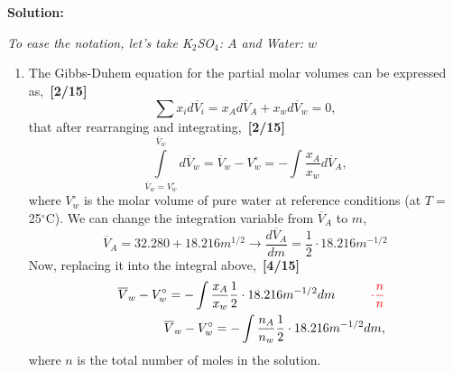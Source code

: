 \documentclass[12pts,a4paper,amsmath,amssymb,floatfix]{article}%
\newcommand{\frc}{\displaystyle\frac}
\newcommand{\red}{\textcolor{red}}
\begin{document}
\begin{enumerate}[label=\bfseries Problem \arabic*]
{\bf Solution:} {\it To ease the notation, let's take K$_{2}$SO$_{4}$: $A$ and Water: $w$

   \begin{enumerate}
     \item The Gibbs-Duhem equation for the partial molar volumes can be expressed as,~\hfill{\bf [2/15]}
     \begin{displaymath}
        \sum\limits x_{i}d\overline{V}_{i} = x_{A} d\overline{V}_{A} + x_{w} d\overline{V}_{w} = 0,
     \end{displaymath}
     that after rearranging and integrating,~\hfill{\bf [2/15]}
     \begin{displaymath}
        \int\limits_{\overline{V}_{w}=V_{w}^{\circ}}^{\overline{V}_{w}}d\overline{V}_{w} = \overline{V}_{w} - V_{w}^{\circ} = -\int\frc{x_{A}}{x_{w}} d\overline{V}_{A},
     \end{displaymath}
     where $V_{w}^{\circ}$ is the molar volume of pure water at reference conditions (at $T=$ 25$^{\circ}$C).  We can change the integration variable from $\overline{V}_{A}$ to $m$,
      \begin{displaymath}
         \overline{V}_{A} = 32.280 + 18.216 m^{1/2} \rightarrow \frc{d\overline{V}_{A}}{dm} = \frc{1}{2}\cdot 18.216 m^{-1/2} 
      \end{displaymath} 
      Now, replacing it into the integral above,~\hfill{\bf [4/15]}
       \begin{eqnarray}
          && \overline{V}_{w} - V_{w}^{\circ} = -\int\frc{x_{A}}{x_{w}} \frc{1}{2}\cdot 18.216 m^{-1/2} dm \hspace{1cm} \red{\cdot\frc{n}{n}} \nonumber \\
          && \overline{V}_{w} - V_{w}^{\circ} = -\int\frc{n_{A}}{n_{w}} \frc{1}{2}\cdot 18.216 m^{-1/2} dm, \label{example4:eqn1}
       \end{eqnarray}
       where $n$ is the total number of moles in the solution.
\medskip
   

\end{enumerate}}
\end{enumerate}
\end{document}
